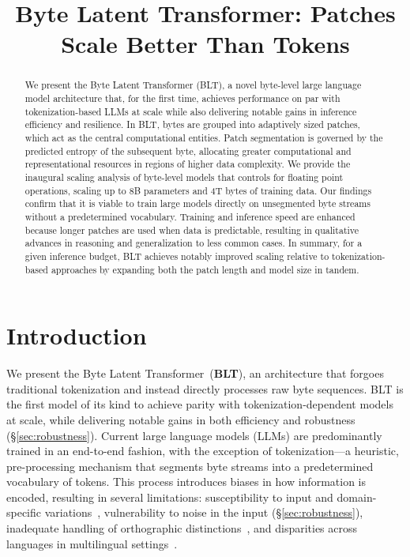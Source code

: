\title{Byte Latent Transformer: Patches Scale Better Than Tokens}

\begin{abstract}
We present the Byte Latent Transformer ({\textsc BLT}), a novel byte-level large language model architecture that, for the first time, achieves performance on par with tokenization-based LLMs at scale while also delivering notable gains in inference efficiency and resilience. In {\textsc BLT}, bytes are grouped into adaptively sized patches, which act as the central computational entities. Patch segmentation is governed by the predicted entropy of the subsequent byte, allocating greater computational and representational resources in regions of higher data complexity. We provide the inaugural scaling analysis of byte-level models that controls for floating point operations, scaling up to 8B parameters and 4T bytes of training data. Our findings confirm that it is viable to train large models directly on unsegmented byte streams without a predetermined vocabulary. Training and inference speed are enhanced because longer patches are used when data is predictable, resulting in qualitative advances in reasoning and generalization to less common cases. In summary, for a given inference budget, {\textsc BLT} achieves notably improved scaling relative to tokenization-based approaches by expanding both the patch length and model size in tandem.
\end{abstract}

\section{Introduction}
\label{section:intro}

We present the Byte Latent Transformer~(\textbf{BLT}), an architecture that forgoes traditional tokenization and instead directly processes raw byte sequences. BLT is the first model of its kind to achieve parity with tokenization-dependent models at scale, while delivering notable gains in both efficiency and robustness (\S\ref{sec:robustness}). Current large language models (LLMs) are predominantly trained in an end-to-end fashion, with the exception of tokenization—a heuristic, pre-processing mechanism that segments byte streams into a predetermined vocabulary of tokens. This process introduces biases in how information is encoded, resulting in several limitations: susceptibility to input and domain-specific variations~\citep{dagangetting}, vulnerability to noise in the input (\S\ref{sec:robustness}), inadequate handling of orthographic distinctions~\citep{edman2024cute}, and disparities across languages in multilingual settings~\citep{liang2023xlm,petrov2024language,limisiewicz2024myte}.

